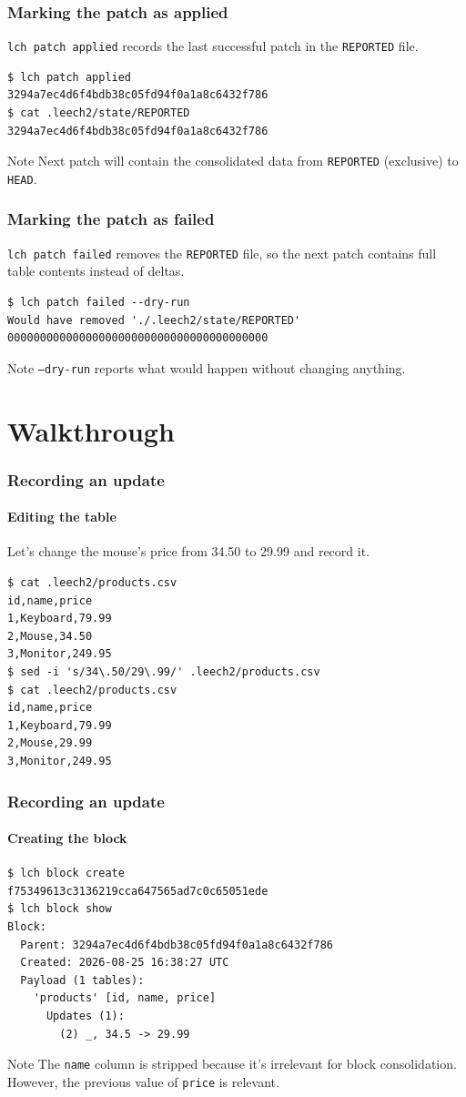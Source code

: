 \documentclass{beamer}
\begin{document}
\begin{frame}[fragile]
\frametitle{Marking the patch as applied}
\texttt{lch patch applied} records the last successful patch in the
\texttt{REPORTED} file.
\begin{verbatim}
$ lch patch applied
3294a7ec4d6f4bdb38c05fd94f0a1a8c6432f786
$ cat .leech2/state/REPORTED
3294a7ec4d6f4bdb38c05fd94f0a1a8c6432f786
\end{verbatim}
\begin{block}{Note}
Next patch will contain the consolidated data from \texttt{REPORTED} (exclusive) to
\texttt{HEAD}.
\end{block}
\end{frame}

\begin{frame}[fragile]
\frametitle{Marking the patch as failed}
\texttt{lch patch failed} removes the \texttt{REPORTED} file, so the next patch
contains full table contents instead of deltas.
\begin{verbatim}
$ lch patch failed --dry-run
Would have removed './.leech2/state/REPORTED'
0000000000000000000000000000000000000000
\end{verbatim}
\bigskip
\begin{block}{Note}
\texttt{--dry-run} reports what would happen without changing anything.
\end{block}
\end{frame}

\section{Walkthrough}

\begin{frame}[fragile]
\frametitle{Recording an update}
\framesubtitle{Editing the table}
Let's change the mouse's price from 34.50 to 29.99 and record it.
\begin{verbatim}
$ cat .leech2/products.csv
id,name,price
1,Keyboard,79.99
2,Mouse,34.50
3,Monitor,249.95
$ sed -i 's/34\.50/29\.99/' .leech2/products.csv
$ cat .leech2/products.csv
id,name,price
1,Keyboard,79.99
2,Mouse,29.99
3,Monitor,249.95
\end{verbatim}
\end{frame}

\begin{frame}[fragile]
\frametitle{Recording an update}
\framesubtitle{Creating the block}
\begin{verbatim}
$ lch block create
f75349613c3136219cca647565ad7c0c65051ede
$ lch block show
Block:
  Parent: 3294a7ec4d6f4bdb38c05fd94f0a1a8c6432f786
  Created: 2026-08-25 16:38:27 UTC
  Payload (1 tables):
    'products' [id, name, price]
      Updates (1):
        (2) _, 34.5 -> 29.99
\end{verbatim}
\begin{block}{Note}
The \texttt{name} column is stripped because it's irrelevant for block
consolidation. However, the previous value of \texttt{price} is relevant.
\end{block}
\end{frame}
\end{document}
